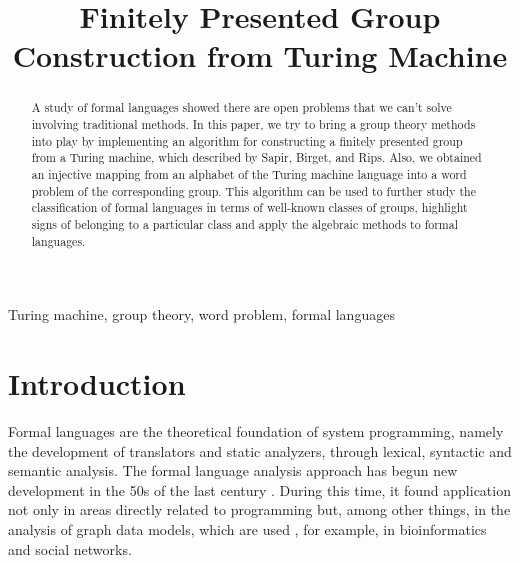\documentclass[conference]{IEEEtran}
\theoremstyle{definition}
\begin{document}
\title{Finitely Presented Group Construction from Turing Machine}

\author{
\and
{}
}

\maketitle

\begin{abstract}
A study of formal languages showed there are open problems that we can’t solve involving traditional methods. In this paper, we try to bring a group theory methods into play by implementing an algorithm for constructing a finitely presented group from a Turing machine, which described by Sapir, Birget, and Rips. Also, we obtained an injective mapping from an alphabet of the Turing machine language into a word problem of the corresponding group. This algorithm can be used to further study the classification of formal languages ​​in terms of well-known classes of groups, highlight signs of belonging to a particular class and apply the algebraic methods to formal languages.
\end{abstract}

\begin{IEEEkeywords}
Turing machine, group theory, word problem, formal languages
\end{IEEEkeywords}

\section{Introduction}

Formal languages are the theoretical foundation of system programming, 
namely the development of translators and static analyzers, through lexical, 
syntactic and semantic analysis. 
The formal language analysis approach has begun new development in the 50s of the last century \cite{chomsky1, chomsky2}. 
During this time, it found application not only in areas directly 
related to programming but, among other things, in the analysis of graph data models, 
which are used \cite{Hellings2015QueryingFP, Azimov2017ContextfreePQ}, 
for example, in bioinformatics and social networks.
\end{document}
